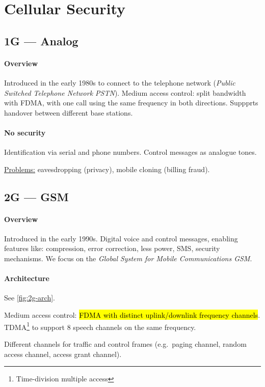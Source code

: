 \section{Cellular Security}

\subsection{1G --- Analog}

\paragraph{Overview}
Introduced in the early 1980s to connect to the telephone network
(\textit{Public Switched Telephone Network PSTN}). Medium access control: split
bandwidth with FDMA, with one call using the same frequency in both directions.
Suppprts handover between different base stations.

\paragraph{No security}
Identification via serial and phone numbers. Control messages as analogue
tones.

\underline{Problems:} eavesdropping (privacy), mobile cloning (billing fraud).

\subsection{2G --- GSM}

\paragraph{Overview}
Introduced in the early 1990s. Digital voice and control messages, enabling
features like: compression, error correction, less power, SMS, security
mechanisms. We focus on the \textit{Global System for Mobile Communications
	GSM}.

\paragraph{Architecture}
See \autoref{fig:2g-arch}.

Medium access control: \hl{FDMA with distinct uplink/downlink frequency channels}.
TDMA\footnote{Time-division multiple access} to support 8 speech channels on
the same frequency.

Different channels for traffic and control frames (e.g.\ paging channel, random
access channel, access grant channel).

